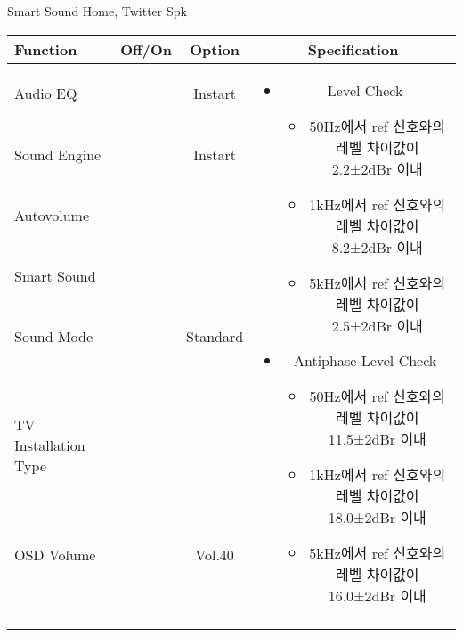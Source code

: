 \begin{frame}[t]{Smart Sound Home, Twitter Spk}
\begin{tiny}
\begin{tabular}{@{}lccc@{}}
\toprule
Function & Off/On & Option & Specification \\
\midrule
Audio EQ & \color{black}{Off} & Instart &
\multirow{10}{60mm}{
\begin{itemize}
	\item Level Check
	\begin{itemize}
		\item 50Hz에서 ref 신호와의 레벨 차이값이 2.2±2dBr 이내
		\item 1kHz에서 ref 신호와의 레벨 차이값이 8.2±2dBr 이내
		\item 5kHz에서 ref 신호와의 레벨 차이값이 2.5±2dBr 이내
	\end{itemize}
	\item Antiphase Level Check
	\begin{itemize}
		\item 50Hz에서 ref 신호와의 레벨 차이값이 11.5±2dBr 이내
		\item 1kHz에서 ref 신호와의 레벨 차이값이 18.0±2dBr 이내
		\item 5kHz에서 ref 신호와의 레벨 차이값이 16.0±2dBr 이내
	\end{itemize}
\end{itemize}
} \\
Sound Engine & \color{blue}{On} & Instart & \\
Autovolume & \color{black}{Off} & & \\
Smart Sound & \color{blue}{On} & & \\
Sound Mode & \color{blue}{On} & Standard & \\
TV Installation Type & \color{blue}{On} & \color{black}{Standtype1} & \\
OSD Volume & \color{blue}{On} & Vol.40 & \\
& & & \\
& & & \\
& & & \\
& & & \\
\midrule
\end{tabular}
\end{tiny}

\end{frame}